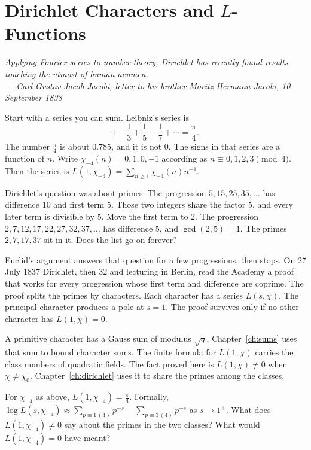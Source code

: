 \chapter{Dirichlet Characters and \texorpdfstring{$L$}{L}-Functions}\label{ch:characters}

\begin{center}\itshape
Applying Fourier series to number theory, Dirichlet has recently found results touching the utmost of human acumen.\\
\upshape --- Carl Gustav Jacob Jacobi, letter to his brother Moritz Hermann Jacobi, 10 September 1838
\end{center}

Start with a series you can sum. Leibniz's series is
\[
1-\frac13+\frac15-\frac17+\cdots=\frac\pi4.
\]
The number $\frac\pi4$ is about $0.785$, and it is not $0$. The signs in that series are a function of $n$. Write $\chi_{-4}(n)=0,1,0,-1$ according as $n\equiv0,1,2,3\pmod4$. Then the series is $L(1,\chi_{-4})=\sum_{n\ge1}\chi_{-4}(n)n^{-1}$.

Dirichlet's question was about primes. The progression $5,15,25,35,\dots$ has difference $10$ and first term $5$. Those two integers share the factor $5$, and every later term is divisible by $5$. Move the first term to $2$. The progression $2,7,12,17,22,27,32,37,\dots$ has difference $5$, and $\gcd(2,5)=1$. The primes $2,7,17,37$ sit in it. Does the list go on forever?

Euclid's argument answers that question for a few progressions, then stops. On 27 July 1837 Dirichlet, then 32 and lecturing in Berlin, read the Academy a proof that works for every progression whose first term and difference are coprime. The proof splits the primes by characters. Each character has a series $L(s,\chi)$. The principal character produces a pole at $s=1$. The proof survives only if no other character has $L(1,\chi)=0$.

A primitive character has a Gauss sum of modulus $\sqrt q$. Chapter~\ref{ch:sums} uses that sum to bound character sums. The finite formula for $L(1,\chi)$ carries the class numbers of quadratic fields. The fact proved here is $L(1,\chi)\ne0$ when $\chi\ne\chi_0$. Chapter~\ref{ch:dirichlet} uses it to share the primes among the classes.

\begin{think}
For $\chi_{-4}$ as above, $L(1,\chi_{-4})=\frac\pi4$. Formally,
$\log L(s,\chi_{-4})\approx\sum_{p\equiv1\,(4)}p^{-s}-\sum_{p\equiv3\,(4)}p^{-s}$ as $s\to1^+$. What does $L(1,\chi_{-4})\ne0$ say about the primes in the two classes?
What would $L(1,\chi_{-4})=0$ have meant?
\end{think}

